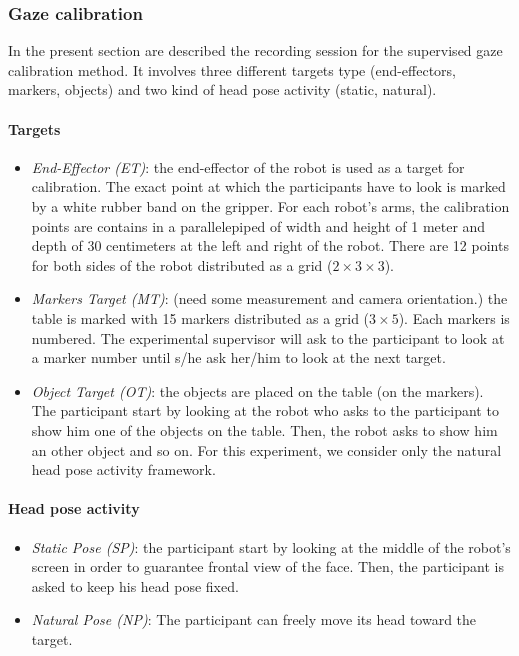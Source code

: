 \documentclass[11pt,a4paper]{article}
\begin{document}
\subsubsection{Gaze calibration}
In the present section are described the recording session for the supervised gaze calibration method. It involves three different targets type (end-effectors, markers, objects) and two kind of head pose activity (static, natural).
\paragraph{Targets}
\begin{itemize}
\item \textit{End-Effector (ET)}: the end-effector of the robot is used as a target for calibration. The exact point at which the participants have to look is marked by a white rubber band on the gripper. For each robot's arms, the calibration points are contains in a parallelepiped of width and height of 1 meter and depth of 30 centimeters at the left and right of the robot. There are 12 points for both sides of the robot distributed as a grid ($2 \times 3 \times 3$).
\item \textit{Markers Target (MT)}: (need some measurement and camera orientation.) the table is marked with 15 markers distributed as a grid ($3 \times 5$). Each markers is numbered. The experimental supervisor will ask to the participant to look at a marker number until s/he ask her/him to look at the next target.
\item \textit{Object Target (OT)}: the objects are placed on the table (on the markers). The participant start by looking at the robot who asks to the participant to show him one of the objects on the table. Then, the robot asks to show him an other object and so on. For this experiment, we consider only the natural head pose activity framework.
\end{itemize}
\paragraph{Head pose activity}
\begin{itemize}
\item \textit{Static Pose (SP)}: the participant start by looking at the middle of the robot's screen in order to guarantee frontal view of the face. Then, the participant is asked to keep his head pose fixed.
\item \textit{Natural Pose (NP)}: The participant can freely move its head toward the target.
\end{itemize}
\end{document}
